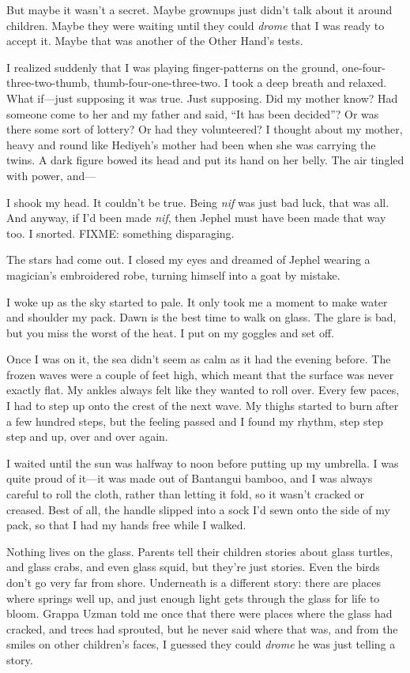 But maybe it wasn't a secret.  Maybe grownups just didn't talk about
it around children.  Maybe they were waiting until they could \emph{drome}
that I was ready to accept it.  Maybe that was another of the Other
Hand's tests.

I realized suddenly that I was playing finger-patterns on the ground,
one-four-three-two-thumb, thumb-four-one-three-two.  I took a deep
breath and relaxed.  What if---just supposing it was true.  Just
supposing.  Did my mother know?  Had someone come to her and my father
and said, ``It has been decided''?  Or was there some sort of lottery?
Or had they volunteered?  I thought about my mother, heavy and round
like Hediyeh's mother had been when she was carrying the twins.  A
dark figure bowed its head and put its hand on her belly.  The air
tingled with power, and---

I shook my head.  It couldn't be true.  Being \emph{nif} was just bad luck,
that was all.  And anyway, if I'd been made \emph{nif}, then Jephel must
have been made that way too.  I snorted.  FIXME: something
disparaging.

The stars had come out.  I closed my eyes and dreamed of Jephel
wearing a magician's embroidered robe, turning himself into a goat by
mistake.

I woke up as the sky started to pale.  It only took me a moment to
make water and shoulder my pack.  Dawn is the best time to walk on
glass.  The glare is bad, but you miss the worst of the heat.  I put
on my goggles and set off.

Once I was on it, the sea didn't seem as calm as it had the evening
before.  The frozen waves were a couple of feet high, which meant that
the surface was never exactly flat.  My ankles always felt like they
wanted to roll over.  Every few paces, I had to step up onto the crest
of the next wave.  My thighs started to burn after a few hundred
steps, but the feeling passed and I found my rhythm, step step step
and up, over and over again.

I waited until the sun was halfway to noon before putting up my
umbrella.  I was quite proud of it---it was made out of Bantangui
bamboo, and I was always careful to roll the cloth, rather than
letting it fold, so it wasn't cracked or creased.  Best of all, the
handle slipped into a sock I'd sewn onto the side of my pack, so that
I had my hands free while I walked.

Nothing lives on the glass.  Parents tell their children stories about
glass turtles, and glass crabs, and even glass squid, but they're just
stories.  Even the birds don't go very far from shore.  Underneath is
a different story: there are places where springs well up, and just
enough light gets through the glass for life to bloom.  Grappa Uzman
told me once that there were places where the glass had cracked, and
trees had sprouted, but he never said where that was, and from the
smiles on other children's faces, I guessed they could \emph{drome} he was
just telling a story.

